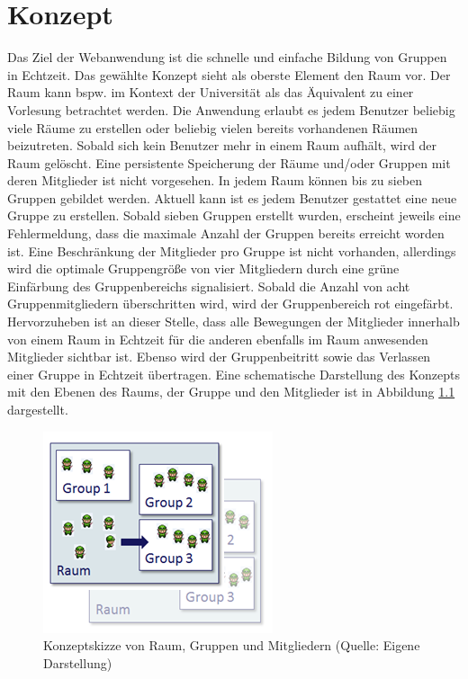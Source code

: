 \chapter{Konzept}
\label{konzept}

Das Ziel der Webanwendung ist die schnelle und einfache Bildung von Gruppen in Echtzeit. Das gewählte Konzept sieht als oberste Element den Raum vor. Der Raum kann bspw. im Kontext der Universität als das Äquivalent zu einer Vorlesung betrachtet werden. Die Anwendung erlaubt es jedem Benutzer beliebig viele Räume zu erstellen oder beliebig vielen bereits vorhandenen Räumen beizutreten. Sobald sich kein Benutzer mehr in einem Raum aufhält, wird der Raum gelöscht. Eine persistente Speicherung der Räume und/oder Gruppen mit deren Mitglieder ist nicht vorgesehen. 
\newline\newline
In jedem Raum können bis zu sieben Gruppen gebildet werden. Aktuell kann ist es jedem Benutzer gestattet eine neue Gruppe zu erstellen. Sobald sieben Gruppen erstellt wurden, erscheint jeweils eine Fehlermeldung, dass die maximale Anzahl der Gruppen bereits erreicht worden ist. Eine Beschränkung der Mitglieder pro Gruppe ist nicht vorhanden, allerdings wird die optimale Gruppengröße von vier Mitgliedern durch eine grüne Einfärbung des Gruppenbereichs signalisiert. Sobald die Anzahl von acht Gruppenmitgliedern überschritten wird, wird der Gruppenbereich rot eingefärbt. Hervorzuheben ist an dieser Stelle, dass alle Bewegungen der Mitglieder innerhalb von einem Raum in Echtzeit für die anderen ebenfalls im Raum anwesenden Mitglieder sichtbar ist. Ebenso wird der Gruppenbeitritt sowie das Verlassen einer Gruppe in Echtzeit übertragen. Eine schematische Darstellung des Konzepts mit den Ebenen des Raums, der Gruppe und den Mitglieder ist in Abbildung \ref{konzeptskizze} dargestellt.

\begin{figure}[h]
\centering
\includegraphics{graphiken/konzeptskizze.png}%
\caption{Konzeptskizze von Raum, Gruppen und Mitgliedern (Quelle: Eigene Darstellung)}%
\label{konzeptskizze}%
\end{figure}

